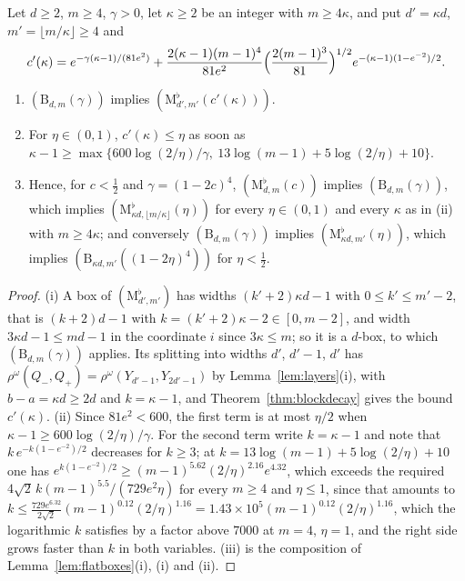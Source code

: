 \begin{corollary}
\label{cor:blockequiv}
Let $d\ge2$, $m\ge4$, $\gamma>0$, let $\kappa\ge2$ be an integer with
$m\ge4\kappa$, and put $d'=\kappa d$, $m'=\lfloor m/\kappa\rfloor\ge4$ and
\[
c'(\kappa)=e^{-\gamma(\kappa-1)/(81e^2)}+\frac{2(\kappa-1)(m-1)^4}{81e^2}
\Bigl(\frac{2(m-1)^3}{81}\Bigr)^{1/2}e^{-(\kappa-1)(1-e^{-2})/2}.
\]
\begin{enumerate}[label=\textup{(\roman*)},leftmargin=*]
\item $(\mathrm B_{d,m}(\gamma))$ implies $(\mathrm M^\flat_{d',m'}(c'(\kappa)))$.
\item For $\eta\in(0,1)$, $c'(\kappa)\le\eta$ as soon as $\kappa-1\ge\max\{
600\log(2/\eta)/\gamma,\ 13\log(m-1)+5\log(2/\eta)+10\}$.
\item Hence, for $c<\frac12$ and $\gamma=(1-2c)^4$, $(\mathrm M^\flat_{d,m}
(c))$ implies $(\mathrm B_{d,m}(\gamma))$, which implies $(\mathrm M^\flat_{
\kappa d,\lfloor m/\kappa\rfloor}(\eta))$ for every $\eta\in(0,1)$ and every
$\kappa$ as in \textup{(ii)} with $m\ge4\kappa$; and conversely
$(\mathrm B_{d,m}(\gamma))$ implies $(\mathrm M^\flat_{\kappa d,m'}(\eta))$,
which implies $(\mathrm B_{\kappa d,m'}((1-2\eta)^4))$ for $\eta<\frac12$.
\end{enumerate}
\end{corollary}

\begin{proof}
(i) A box of $(\mathrm M^\flat_{d',m'})$ has widths $(k'+2)\kappa d-1$ with
$0\le k'\le m'-2$, that is $(k+2)d-1$ with $k=(k'+2)\kappa-2\in[0,m-2]$, and
width $3\kappa d-1\le md-1$ in the coordinate $i$ since $3\kappa\le m$; so it
is a $d$-box, to which $(\mathrm B_{d,m}(\gamma))$ applies. Its splitting into
widths $d'$, $d'-1$, $d'$ has $\rho^\omega(Q_-,Q_+)=\rho^\omega(Y_{d'-1},
Y_{2d'-1})$ by Lemma~\ref{lem:layers}(i), with $b-a=\kappa d\ge2d$ and
$k=\kappa-1$, and Theorem~\ref{thm:blockdecay} gives the bound $c'(\kappa)$.
(ii) Since $81e^2<600$, the first term is at most $\eta/2$ when $\kappa-1\ge
600\log(2/\eta)/\gamma$. For the second term write $k=\kappa-1$ and note that
$k\,e^{-k(1-e^{-2})/2}$ decreases for $k\ge3$; at $k=13\log(m-1)+5\log(2/\eta)
+10$ one has $e^{k(1-e^{-2})/2}\ge(m-1)^{5.62}(2/\eta)^{2.16}e^{4.32}$, which
exceeds the required $4\sqrt2\,k(m-1)^{5.5}/(729e^2\eta)$ for every $m\ge4$
and $\eta\le1$, since that amounts to $k\le\frac{729e^{6.32}}{2\sqrt2}(m-1)^{
0.12}(2/\eta)^{1.16}=1.43\times10^5(m-1)^{0.12}(2/\eta)^{1.16}$, which the
logarithmic $k$ satisfies by a factor above $7000$ at $m=4$, $\eta=1$, and
the right side grows faster than $k$ in both variables.
(iii) is the composition of Lemma~\ref{lem:flatboxes}(i), (i) and (ii).
\end{proof}

